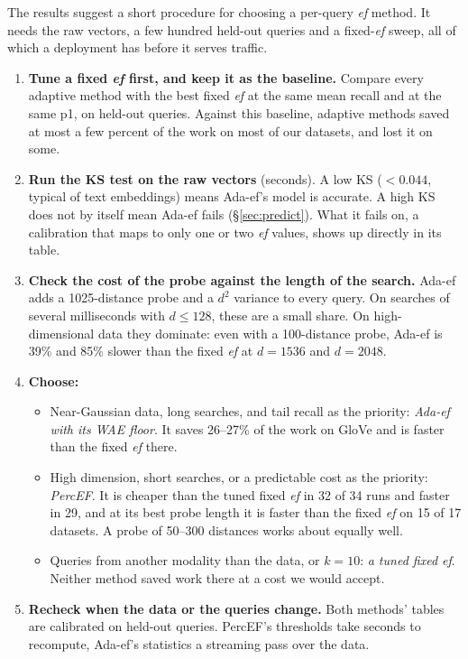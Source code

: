 \documentclass[twocolumn]{svjour3}
\newcommand{\ef}{\textit{ef}}
\begin{document}
The results suggest a short procedure for choosing a per-query \ef{} method. It needs the raw
vectors, a few hundred held-out queries and a fixed-\ef{} sweep, all of which a deployment has
before it serves traffic.
\begin{enumerate}
\item \textbf{Tune a fixed \ef{} first, and keep it as the baseline.} Compare every adaptive method
  with the best fixed \ef{} at the same mean recall and at the same p1, on held-out queries. Against
  this baseline, adaptive methods saved at most a few percent of the work on most of our datasets,
  and lost it on some.
\item \textbf{Run the KS test on the raw vectors} (seconds). A low KS ($< 0.044$, typical of text
  embeddings) means Ada-ef's model is accurate. A high KS does not by itself mean Ada-ef fails
  (\S\ref{sec:predict}). What it fails on, a calibration that maps to only one or two \ef{} values,
  shows up directly in its table.
\item \textbf{Check the cost of the probe against the length of the search.} Ada-ef adds a
  1025-distance probe and a $d^2$ variance to every query. On searches of several milliseconds with
  $d \le 128$, these are a small share. On high-dimensional data they dominate: even with a
  100-distance probe, Ada-ef is 39\% and 85\% slower than the fixed \ef{} at $d = 1536$ and
  $d = 2048$.
\item \textbf{Choose:}
  \begin{itemize}
  \item Near-Gaussian data, long searches, and tail recall as the priority: \emph{Ada-ef with its
    WAE floor}. It saves 26--27\% of the work on GloVe and is faster than the fixed \ef{} there.
  \item High dimension, short searches, or a predictable cost as the priority: \emph{PercEF}. It is
    cheaper than the tuned fixed \ef{} in 32 of 34 runs and faster in 29, and at its best probe
    length it is faster than the fixed \ef{} on 15 of 17 datasets. A probe of 50--300 distances works
    about equally well.
  \item Queries from another modality than the data, or $k = 10$: \emph{a tuned fixed \ef{}}.
    Neither method saved work there at a cost we would accept.
  \end{itemize}
\item \textbf{Recheck when the data or the queries change.} Both methods' tables are calibrated on
  held-out queries. PercEF's thresholds take seconds to recompute, Ada-ef's statistics a streaming
  pass over the data.
\end{enumerate}
\end{document}
